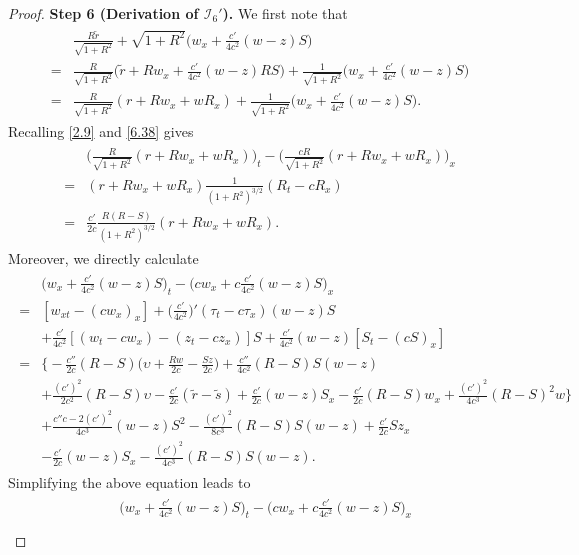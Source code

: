 \documentclass[10pt,a4paper]{amsart}
\newcommand{\fr}{\frac}
\begin{document}
\begin{proof}
\textbf{Step 6 (Derivation of $\mathcal{I}_{6}'$).} We first note that
\begin{align}\label{6.48}
\begin{split}
&\fr{R\tilde{r}}{\sqrt{1+R^2}} +\sqrt{1+R^2}\Big(w_x+\fr{c'}{4c^2}(w-z)S\Big) \\
=&\fr{R}{\sqrt{1+R^2}}\Big(\tilde{r}+Rw_x+\fr{c'}{4c^2}(w-z)RS\Big) +\fr{1}{\sqrt{1+R^2}}\Big(w_x+\fr{c'}{4c^2}(w-z)S\Big)\\
=&\fr{R}{\sqrt{1+R^2}}(r+Rw_x+wR_x) +\fr{1}{\sqrt{1+R^2}}\Big(w_x+\fr{c'}{4c^2}(w-z)S\Big).
\end{split}
\end{align}
Recalling \eqref{2.9} and \eqref{6.38} gives
\begin{align}\label{6.49}
\begin{split}
&\Big(\fr{R}{\sqrt{1+R^2}}(r+Rw_x+wR_x)\Big)_t - \Big(\fr{cR}{\sqrt{1+R^2}}(r+Rw_x+wR_x)\Big)_x \\
=& (r+Rw_x+wR_x)\fr{1}{(1+R^2)^{3/2}}(R_t-cR_x) \\
=& \fr{c'}{2c}\fr{R(R-S)}{(1+R^2)^{3/2}}(r+Rw_x+wR_x).
\end{split}
\end{align}
Moreover, we directly calculate
\begin{align*}
\begin{split}
&\Big(w_x+\fr{c'}{4c^2}(w-z)S\Big)_t-\Big(cw_x+c\fr{c'}{4c^2}(w-z)S\Big)_x \\
=& [w_{xt}-(cw_x)_x] +\Big(\fr{c'}{4c^2}\Big)'(\tau_t-c\tau_x)(w-z)S \\
&+\fr{c'}{4c^2}[(w_t-cw_x)-(z_t-cz_x)]S +\fr{c'}{4c^2}(w-z)[S_t-(cS)_x] \\
=& \bigg\{-\fr{c''}{2c}(R-S)\Big(\upsilon+\fr{Rw}{2c}-\fr{Sz}{2c}\Big) +\fr{c''}{4c^2}(R-S)S(w-z) \\ &+\fr{(c')^2}{2c^2}(R-S)\upsilon -\fr{c'}{2c}(\tilde{r}-\tilde{s}) +\fr{c'}{2c}(w-z)S_x -\fr{c'}{2c}(R-S)w_x +\fr{(c')^2}{4c^3}(R-S)^2w \bigg\} \\
&+\fr{c''c-2(c')^2}{4c^3}(w-z)S^2 -\fr{(c')^2}{8c^3}(R-S)S(w-z) +\fr{c'}{2c}Sz_x \\
&-\fr{c'}{2c}(w-z)S_x -\fr{(c')^2}{4c^3}(R-S)S(w-z).
\end{split}
\end{align*}
Simplifying the above equation leads to
\begin{align}\label{6.50}
\begin{split}
&\Big(w_x+\fr{c'}{4c^2}(w-z)S\Big)_t-\Big(cw_x+c\fr{c'}{4c^2}(w-z)S\Big)_x \\

\end{split}
\end{align}
\end{proof}
\end{document}
